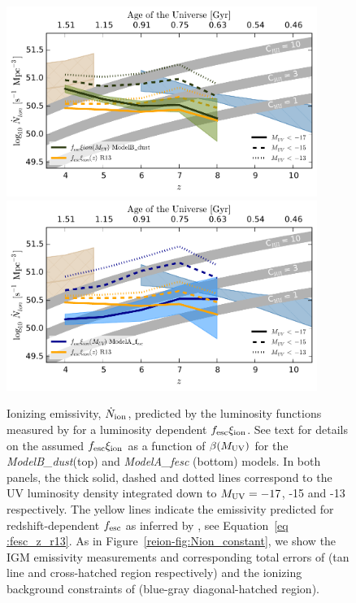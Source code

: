 \begin{figure}
\centering
  \includegraphics[width=0.9\textwidth]{plots/Fig10a.pdf}
  \includegraphics[width=0.9\textwidth]{plots/Fig10b.pdf}
  \caption[Ionizing emissivity, $\dot{N}_{\rm{ion}}$, predicted by the luminosity functions measured by \citet{2015ApJ...803...34B} for a luminosity dependent $f_{\rm{esc}}\xi_{\rm{ion}}$. See text for details on the assumed $f_{\rm{esc}}\xi_{\rm{ion}}$ as a function of $\beta(M_{\rm{UV}})$ for the \emph{ModelB\_dust}(top) and \emph{ModelA\_fesc} (bottom) models.]{Ionizing emissivity, $\dot{N}_{\rm{ion}}$, predicted by the luminosity functions measured by \citet{2015ApJ...803...34B} for a luminosity dependent $f_{\rm{esc}}\xi_{\rm{ion}}$. See text for details on the assumed $f_{\rm{esc}}\xi_{\rm{ion}}$ as a function of $\beta(M_{\rm{UV}})$ for the \emph{ModelB\_dust}(top) and \emph{ModelA\_fesc} (bottom) models. In both panels, the thick solid, dashed and dotted lines correspond to the UV luminosity density integrated down to $M_{\rm{UV}} = -17$, -15 and -13 respectively. The yellow lines indicate the emissivity predicted for redshift-dependent $f_{\rm{esc}}$ as inferred by , see Equation~\ref{eq	:fesc_z_r13}. As in Figure~\ref{reion-fig:Nion_constant}, we show the IGM emissivity measurements and corresponding total errors of \citet{Becker:2013hc} (tan line and cross-hatched region respectively) and the ionizing background constraints of \citet{Bouwens:2015tm} (blue-gray diagonal-hatched region).}
  \label{reion-fig:Nion_xi_kappa_zMuv}
\end{figure}

